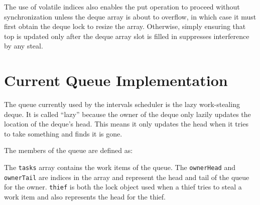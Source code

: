 The use of volatile indices also enables the put operation to proceed
without synchronization unless the deque array is about to overflow,
in which case it must first obtain the deque lock to resize the
array. Otherwise, simply ensuring that top is updated only after the
deque array slot is filled in suppresses interference by any steal.


\section{Current Queue Implementation}
\label{sec:queues-background-current-implementation}

The queue currently used by the intervals scheduler is the lazy
work-stealing deque. It is called ``lazy'' because the owner of the
deque only lazily updates the location of the deque's head. This means
it only updates the head when it tries to take something and finds it
is gone.


The members of the queue are defined as:



The \lstinline!tasks! array contains the work items of the queue. The
\lstinline!ownerHead! and \lstinline!ownerTail! are indices in the
array and represent the head and tail of the queue for the
owner. \lstinline!thief! is both the lock object used when a thief
tries to steal a work item and also represents the head for the thief.









    
